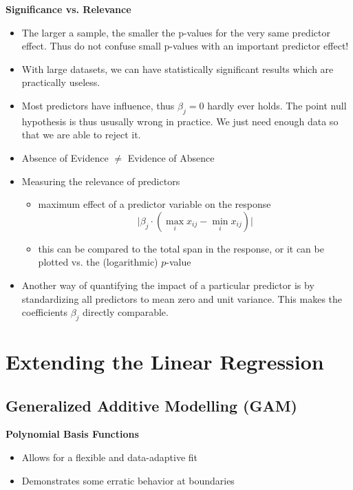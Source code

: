 \documentclass[a4paper]{article}
\begin{document}
\textbf{Significance vs. Relevance}
\begin{itemize}
    \item The larger a sample, the smaller the p-values for the very same predictor effect. Thus do not confuse small p-values with an important predictor effect!
    \item With large datasets, we can have statistically significant results which are practically useless.
    \item Most predictors have influence, thus $\beta_j=0$ hardly ever holds. The point null hypothesis is thus ususally wrong in practice. We just need enough data so that we are able to reject it.
    \item Absence of Evidence $\neq$ Evidence of Absence
    \item Measuring the relevance of predictors
    \begin{itemize}
        \item maximum effect of a predictor variable on the response
        \[\lvert \beta_j\cdot(\max_i x_{ij}-\min_i x_{ij})\rvert \]
        \item this can be compared to the total span in the response, or it can be plotted vs. the (logarithmic) $p$-value
    \end{itemize}
    \item Another way of quantifying the impact of a particular predictor is by standardizing all predictors to mean zero and unit variance. This makes the coefficients $\beta_j$ directly comparable.
\end{itemize}


\section{Extending the Linear Regression}

\subsection{Generalized Additive Modelling (GAM)}

\textbf{Polynomial Basis Functions}
\begin{itemize}
    \item Allows for a flexible and data-adaptive fit
    \item Demonstrates some erratic behavior at boundaries
\end{itemize}
\end{document}

